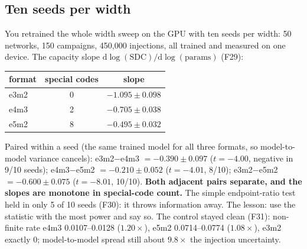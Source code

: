 \subsection{Ten seeds per width}
You retrained the whole width sweep on the GPU with ten seeds per width: 50 networks, 150 campaigns, 450{,}000 injections, all trained and measured on one device. The capacity slope $\mathrm{d}\log(\text{SDC})/\mathrm{d}\log(\text{params})$ (F29):
\begin{center}
\small
\begin{tabular}{lcc}
\toprule
format & special codes & slope \\
\midrule
e3m2 & 0 & $-1.095\pm0.098$ \\
e4m3 & 2 & $-0.705\pm0.038$ \\
e5m2 & 8 & $-0.495\pm0.032$ \\
\bottomrule
\end{tabular}
\end{center}
Paired within a seed (the same trained model for all three formats, so model-to-model variance cancels): e3m2$-$e4m3 $=-0.390\pm0.097$ ($t=-4.00$, negative in 9/10 seeds); e4m3$-$e5m2 $=-0.210\pm0.052$ ($t=-4.01$, 8/10); e3m2$-$e5m2 $=-0.600\pm0.075$ ($t=-8.01$, 10/10). \textbf{Both adjacent pairs separate, and the slopes are monotone in special-code count.}
The simple endpoint-ratio test held in only 5 of 10 seeds (F30): it throws information away. The lesson: use the statistic with the most power and say so. The control stayed clean (F31): non-finite rate e4m3 0.0107--0.0128 ($1.20\times$), e5m2 0.0714--0.0774 ($1.08\times$), e3m2 exactly 0; model-to-model spread still about $9.8\times$ the injection uncertainty.

